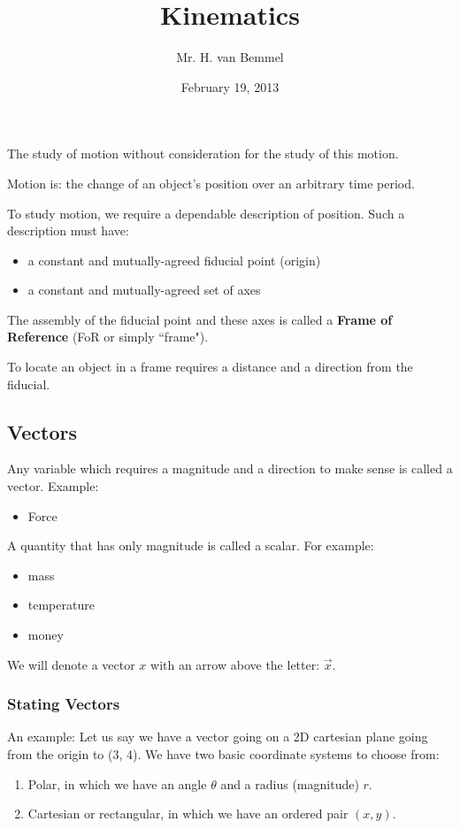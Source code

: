 \documentclass[letterpaper]{article}
\begin{document}
\title{Kinematics}
\author{Mr. H. van Bemmel}
\date{February 19, 2013}
\maketitle

The study of motion without consideration for the study of this motion.

Motion is: the change of an object's position over an arbitrary time period.

To study motion, we require a dependable description of position.
Such a description must have:
\begin{itemize}
    \item a constant and mutually-agreed fiducial point (origin)
    \item a constant and mutually-agreed set of axes
\end{itemize}
The assembly of the fiducial point and these axes is called a {\bf Frame of Reference} (FoR or simply ``frame").

To locate an object in a frame requires a distance and a direction from the fiducial.

\subsection{Vectors}
Any variable which requires a magnitude and a direction to make sense is called a vector.
Example:
\begin {itemize}
    \item Force
\end{itemize}

A quantity that has only magnitude is called a scalar. For example: 
\begin{itemize}
    \item mass
    \item temperature
    \item money
\end{itemize}

We will denote a vector $x$ with an arrow above the letter: $\vec{x}$.

\subsubsection{Stating Vectors}
An example:
    Let us say we have a vector going on a 2D cartesian plane going from the origin
    to (3, 4). We have two basic coordinate systems to choose from:
    \begin{enumerate}
        \item Polar, in which we have an angle $\theta$ and a radius (magnitude) $r$.
        \item Cartesian or rectangular, in which we have an ordered pair $(x, y)$.
    \end{enumerate}
\end{document}
